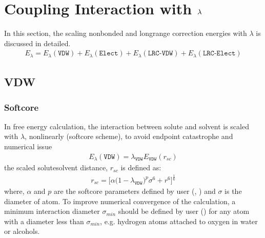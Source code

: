 \documentclass[letterpaper,10pt,english]{sphinxmanual}
\begin{document}
\chapter{Coupling Interaction with \protect\(\lambda\protect\)}
\label{\detokenize{free_energy:coupling-interaction-with-lambda}}\label{\detokenize{free_energy::doc}}
\sphinxAtStartPar
In this section, the scaling nonbonded and long\sphinxhyphen{}range correction energies with \(\lambda\) is discussed in detailed.
\begin{equation*}
\begin{split}E_{\lambda} = E_{\lambda}(\texttt{VDW}) + E_{\lambda}(\texttt{Elect}) + E_{\lambda}(\texttt{LRC-VDW}) + E_{\lambda}(\texttt{LRC-Elect})\end{split}
\end{equation*}

\section{VDW}
\label{\detokenize{free_energy:vdw}}

\subsection{Soft\sphinxhyphen{}core}
\label{\detokenize{free_energy:soft-core}}
\sphinxAtStartPar
In free energy calculation, the  interaction between solute and solvent is scaled with \(\lambda\), non\sphinxhyphen{}linearly (soft\sphinxhyphen{}core scheme), to avoid
end\sphinxhyphen{}point catastrophe and numerical issue
\begin{equation*}
\begin{split}E_{\lambda}(\texttt{VDW}) = \lambda_{\texttt{VDW}} E_{\texttt{VDW}}(r_{sc})\end{split}
\end{equation*}
\sphinxAtStartPar
the scaled solute\sphinxhyphen{}solvent distance, \(r_{sc}\) is defined as:
\begin{equation*}
\begin{split}r_{sc} = \bigg[\alpha {\big(1 - \lambda_{\texttt{VDW}} \big)}^{p}{\sigma}^6 + {r}^6 \bigg]^{\frac{1}{6}}\end{split}
\end{equation*}
\sphinxAtStartPar
where, \(\alpha\) and \(p\) are the soft\sphinxhyphen{}core parameters defined by user (, ) and \(\sigma\) is the diameter of atom.
To improve numerical convergence of the calculation, a minimum interaction diameter \(\sigma_{min}\) should be defined by user () for any atom with a diameter
less than \(\sigma_{min}\), e.g. hydrogen atoms attached to oxygen in water or alcohols.
\end{document}
